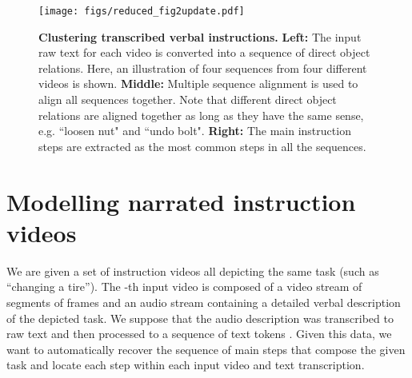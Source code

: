 \documentclass[10pt,twocolumn,letterpaper]{article}
\begin{document}
\begin{figure*}[t]
\texttt{[image: figs/reduced\_fig2update.pdf]}
   \caption{\small {\bf Clustering transcribed verbal instructions.} {\bf Left:} The input raw text for each video is converted into a sequence of direct object relations. Here, an illustration of four sequences from four different videos is shown.  {\bf Middle:} Multiple sequence alignment is used to align all sequences together. Note that different direct object relations are aligned together as long as they have the same sense, e.g. ``loosen nut" and ``undo bolt".  {\bf Right:} The main instruction steps are extracted as the  most common steps in all the sequences. \vspace{-.3cm}
   }
   \label{tab:MSAillustration}
   \vspace*{-0.1cm}
\end{figure*}



\section{Modelling narrated instruction videos}
\label{subsec:model_var}

We are given a set of  instruction videos all depicting the same task (such as ``changing a tire'').
The -th input video is composed of a video stream of  segments of frames  and an audio stream containing a detailed verbal description of the depicted task. 
We suppose that the audio description was transcribed to raw text and then processed to a sequence of  text tokens . 
Given this data, we want to automatically recover the sequence of  main steps that compose the given task and locate each step within each input video and text transcription. 
\end{document}
